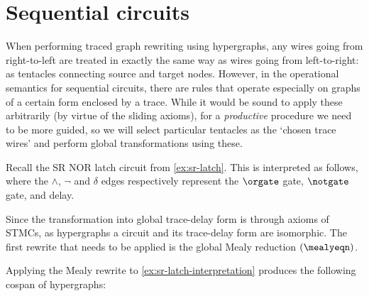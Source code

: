 \section{Sequential circuits}

When performing traced graph rewriting using hypergraphs, any wires going from
right-to-left are treated in exactly the same way as wires going from
left-to-right: as tentacles connecting source and target nodes.
However, in the operational semantics for sequential circuits, there are rules
that operate especially on graphs of a certain form enclosed by a trace.
While it would be sound to apply these arbitrarily (by virtue of the sliding
axioms), for a \emph{productive} procedure we need to be more guided, so we will
select particular tentacles as the `chosen trace wires' and perform global
transformations using these.

\begin{example}\label{ex:sr-latch-interpretation}
    Recall the SR NOR latch circuit from \cref{ex:sr-latch}.
    This is interpreted as
    follows, where the \(\wedge\), \(\neg\) and \(\delta\) edges respectively
    represent the \(\orgate\) gate, \(\notgate\) gate, and delay.
    \begin{center}
    \end{center}
\end{example}

Since the transformation into global trace-delay form is through axioms
of STMCs, as hypergraphs a circuit and its trace-delay form are isomorphic.
The first rewrite that needs to be applied is the global Mealy reduction
\((\mealyeqn)\).

\begin{example}\label{ex:sr-latch-mealy-graph}
    Applying the Mealy rewrite to \cref{ex:sr-latch-interpretation} produces
    the following cospan of hypergraphs:
    \vspace{-1em}
    \begin{center}
    \end{center}
\end{example}

